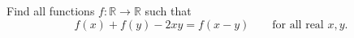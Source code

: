 Find all functions $f:\mathbb{R}\to\mathbb{R}$ such that
\[f(x)+f(y)-2xy=f(x-y)\qquad\text{for all real }x,y.\]
